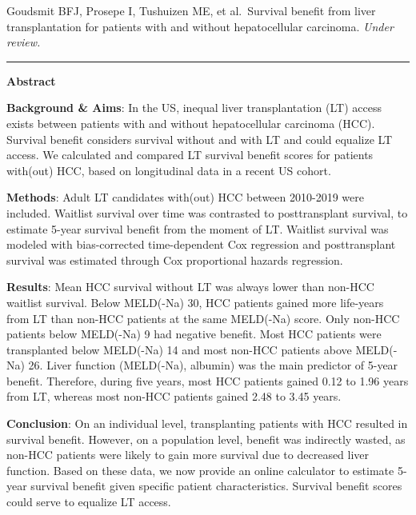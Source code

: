\documentclass[11pt,english,]{book} %
\begin{document}

\vspace*{\fill}

\noindent 
Goudsmit BFJ, Prosepe I, Tushuizen ME, et al.~Survival benefit from liver transplantation for patients with and without hepatocellular carcinoma. \emph{Under review.}

\begin{center}\rule{0.5\linewidth}{0.5pt}\end{center}

\newpage
\nopagecolor
\color{black}

\noindent 
\small

\textbf{Abstract}

\textbf{Background \& Aims}: In the US, inequal liver transplantation (LT) access exists between patients with and without hepatocellular carcinoma (HCC). Survival benefit considers survival without and with LT and could equalize LT access. We calculated and compared LT survival benefit scores for patients with(out) HCC, based on longitudinal data in a recent US cohort.

\textbf{Methods}: Adult LT candidates with(out) HCC between 2010-2019 were included. Waitlist survival over time was contrasted to posttransplant survival, to estimate 5-year survival benefit from the moment of LT. Waitlist survival was modeled with bias-corrected time-dependent Cox regression and posttransplant survival was estimated through Cox proportional hazards regression.

\textbf{Results}: Mean HCC survival without LT was always lower than non-HCC waitlist survival. Below MELD(-Na) 30, HCC patients gained more life-years from LT than non-HCC patients at the same MELD(-Na) score. Only non-HCC patients below MELD(-Na) 9 had negative benefit. Most HCC patients were transplanted below MELD(-Na) 14 and most non-HCC patients above MELD(-Na) 26. Liver function (MELD(-Na), albumin) was the main predictor of 5-year benefit. Therefore, during five years, most HCC patients gained 0.12 to 1.96 years from LT, whereas most non-HCC patients gained 2.48 to 3.45 years.

\textbf{Conclusion}: On an individual level, transplanting patients with HCC resulted in survival benefit. However, on a population level, benefit was indirectly wasted, as non-HCC patients were likely to gain more survival due to decreased liver function. Based on these data, we now provide an online calculator to estimate 5-year survival benefit given specific patient characteristics. Survival benefit scores could serve to equalize LT access.
\end{document}
